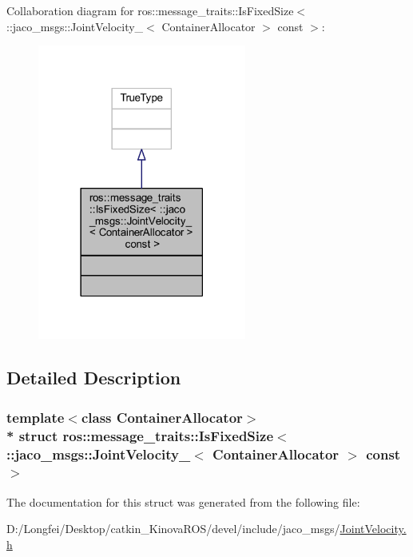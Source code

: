 Collaboration diagram for ros\+:\+:message\+\_\+traits\+:\+:Is\+Fixed\+Size$<$ \+:\+:jaco\+\_\+msgs\+:\+:Joint\+Velocity\+\_\+$<$ Container\+Allocator $>$ const $>$\+:
\nopagebreak
\begin{figure}[H]
\begin{center}
\leavevmode
\includegraphics[width=194pt]{da/de2/structros_1_1message__traits_1_1IsFixedSize_3_01_1_1jaco__msgs_1_1JointVelocity___3_01ContainerA058e4081880af4dda57e65117550e327}
\end{center}
\end{figure}


\subsection{Detailed Description}
\subsubsection*{template$<$class Container\+Allocator$>$\\*
struct ros\+::message\+\_\+traits\+::\+Is\+Fixed\+Size$<$ \+::jaco\+\_\+msgs\+::\+Joint\+Velocity\+\_\+$<$ Container\+Allocator $>$ const  $>$}



The documentation for this struct was generated from the following file\+:\begin{DoxyCompactItemize}
\item 
D\+:/\+Longfei/\+Desktop/catkin\+\_\+\+Kinova\+R\+O\+S/devel/include/jaco\+\_\+msgs/\hyperlink{JointVelocity_8h}{Joint\+Velocity.\+h}\end{DoxyCompactItemize}

